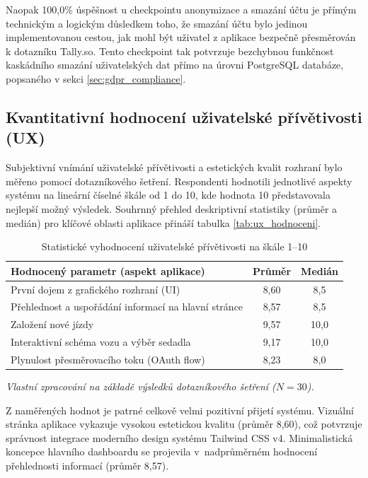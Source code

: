 \documentclass[male,czech,api_bc]{kitheses}
\renewcommand{\arraystretch}{1.23}
\newcommand{\zdroj}[1]{%
    \vspace{1ex}%
    {\footnotesize \raggedright \textit{#1}\par}%
}
\begin{document}
Naopak 100,0\% úspěšnost u checkpointu anonymizace a smazání účtu je přímým technickým a logickým důsledkem toho, že smazání účtu bylo jedinou implementovanou cestou, jak mohl být uživatel z aplikace bezpečně přesměrován k dotazníku Tally.so. Tento checkpoint tak potvrzuje bezchybnou funkčnost kaskádního smazání uživatelských dat přímo na úrovni PostgreSQL databáze, popsaného v sekci \vref{sec:gdpr_compliance}.

\subsection{Kvantitativní hodnocení uživatelské přívětivosti (UX)}
\label{subsec:kvantitativni_ux}

Subjektivní vnímání uživatelské přívětivosti a estetických kvalit rozhraní bylo měřeno pomocí dotazníkového šetření. Respondenti hodnotili jednotlivé aspekty systému na lineární číselné škále od 1 do 10, kde hodnota 10 představovala nejlepší možný výsledek. Souhrnný přehled deskriptivní statistiky (průměr a medián) pro klíčové oblasti aplikace přináší tabulka \vref{tab:ux_hodnoceni}.

\begin{table}[htbp]
    \centering
    \small
    \renewcommand{\arraystretch}{1.23}
    \begin{tabularx}{\textwidth}{@{} >{\raggedright\arraybackslash}X c c @{}}
        \toprule
        \textbf{Hodnocený parametr (aspekt aplikace)} & \textbf{Průměr} & \textbf{Medián} \\
        \midrule
        První dojem z grafického rozhraní (UI) & 8,60 & 8,5 \\
        Přehlednost a uspořádání informací na hlavní stránce & 8,57 & 8,5 \\
        Založení nové jízdy & 9,57 & 10,0 \\
        Interaktivní schéma vozu a výběr sedadla & 9,17 & 10,0 \\
        Plynulost přesměrovacího toku (OAuth flow) & 8,23 & 8,0 \\
        \bottomrule
    \end{tabularx}
    \caption{Statistické vyhodnocení uživatelské přívětivosti na škále 1–10}
    \label{tab:ux_hodnoceni}
    \zdroj{Vlastní zpracování na základě výsledků dotazníkového šetření ($N=30$).}
\end{table}

Z naměřených hodnot je patrné celkově velmi pozitivní přijetí systému. Vizuální stránka aplikace vykazuje vysokou estetickou kvalitu (průměr 8,60), což potvrzuje správnost integrace moderního design systému Tailwind CSS v4. Minimalistická koncepce hlavního dashboardu se projevila v~nadprůměrném hodnocení přehlednosti informací (průměr 8,57).
\end{document}
